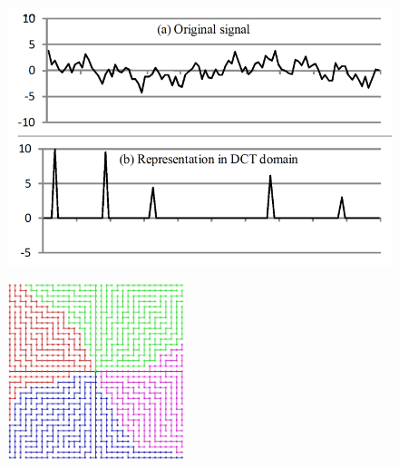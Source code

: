 \begin{figure}
\centering
\begin{minipage}{.5\textwidth}
  \centering
  \includegraphics[width=\linewidth]{images/example-signal-sparse.png}
  \label{fig:sparsesignal}
\end{minipage}%
\begin{minipage}{.5\textwidth}
  \centering
  \includegraphics[width=\linewidth, height=5.2cm]{images/grid-topology-luo.png}
  \label{fig:grid topology}
\end{minipage}
\end{figure}


